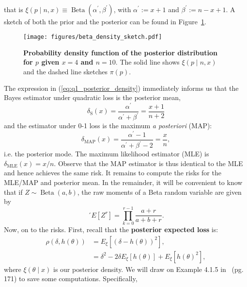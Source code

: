 \documentclass[a4paper,10pt, notitlepage]{report}
\begin{document}
{\begin{align}
\end{align}
that is $\xi(p \mid n, x) \equiv \operatorname{Beta}(\alpha^\prime, \beta^\prime)$, with $\alpha^\prime := x + 1$ and $\beta^\prime := n-x+1$.
A sketch of both the prior and the posterior can be found in Figure~\ref{fig:beta_density}.
\begin{figure}[!ht]
\begin{center}
 \texttt{[image: figures/beta\_density\_sketch.pdf]}
\end{center} 
\caption{\textbf{Probability density function of the posterior distribution for $p$ given $x=4$ and $n=10$}.
The solid line shows $\xi(p \mid n, x)$ and the dashed line sketches $\pi(p)$.
}
\label{fig:beta_density}
\end{figure}
The expression in (\ref{eq:q1_posterior_density}) immediately informs us that the Bayes estimator under quadratic loss is the posterior mean,
\begin{equation*}
 \delta_{\text{S}}(x) = \frac{\alpha^\prime}{\alpha^\prime + \beta^\prime} = \frac{x + 1}{n + 2}
\end{equation*}
and the estimator under 0-1 loss is the maximum \textit{a posteriori} (MAP):
\begin{equation*}
 \delta_{\text{MAP}}(x) = \frac{\alpha^\prime -1 }{\alpha^\prime + \beta^\prime - 2} = \frac{x}{n},
\end{equation*}
i.e. the posterior mode.
The maximum likelihood estimator (MLE) is $\delta_{\text{MLE}}(x) = x/n$.
Observe that the MAP estimator is thus identical to the MLE and hence achieves the same risk.
It remains to compute the risks for the MLE/MAP and posterior mean.
In the remainder, it will be convenient to know that if $Z \sim \operatorname{Beta}(a, b)$,
the raw moments of a Beta random variable  are given by
\begin{equation}
 \label{eq:beta_raw_moments}´
E[Z^r] = \prod_{k=0}^{r-1} \frac{a + r}{a + b + r}. 
\end{equation}
Now, on to the risks.
First, recall that the \textbf{posterior expected loss} is:
\begin{align*}
 \rho(\delta, h(\theta)) &= E_\xi \left[ \left(\delta - h(\theta) \right)^2\right],\\
 &= \delta^2 - 2\delta E_\xi \left[h(\theta)\right] + E_\xi \left[h(\theta)^2 \right],
\end{align*}
where $\xi(\theta \mid x)$ is our posterior density.
We will draw on Example 4.1.5 in~\cite{Robert2007} (pg. 171) to save some computations.
Specifically,
\begin{equation*}

\end{equation*}}
\end{document}
